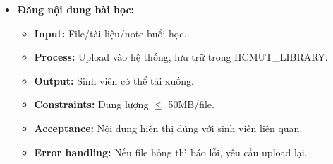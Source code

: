 \begin{itemize}
    \item \textbf{Đăng nội dung bài học:}
    \begin{itemize}
        \item \textbf{Input:} File/tài liệu/note buổi học.
        \item \textbf{Process:} Upload vào hệ thống, lưu trữ trong HCMUT\_LIBRARY.
        \item \textbf{Output:} Sinh viên có thể tải xuống.
        \item \textbf{Constraints:} Dung lượng $\leq$ 50MB/file.
        \item \textbf{Acceptance:} Nội dung hiển thị đúng với sinh viên liên quan.
        \item \textbf{Error handling:} Nếu file hỏng thì báo lỗi, yêu cầu upload lại.
    \end{itemize}
\end{itemize}


